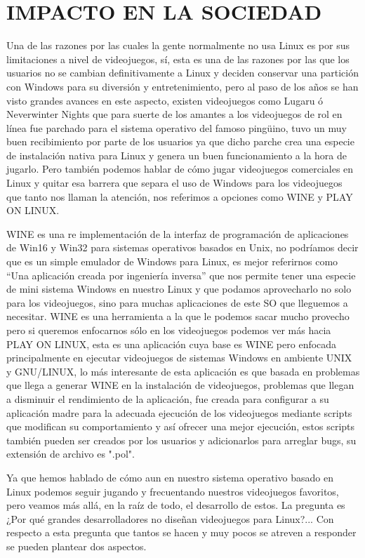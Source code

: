 \section*{IMPACTO EN LA SOCIEDAD}

Una de las razones por las cuales la gente normalmente no usa
Linux es por sus limitaciones a nivel de videojuegos, sí, esta es
una de las razones por las que los usuarios no se cambian
definitivamente a Linux y deciden conservar una partición con
Windows para su diversión y entretenimiento, pero al paso de
los años se han visto grandes avances en este aspecto, existen
videojuegos como Lugaru ó Neverwinter Nights que para suerte
de los amantes a los videojuegos de rol en línea fue parchado
para el sistema operativo del famoso pingüino, tuvo un muy
buen recibimiento por parte de los usuarios ya que dicho parche
crea una especie de instalación nativa para Linux y genera un
buen funcionamiento a la hora de jugarlo. Pero también
podemos hablar de cómo jugar videojuegos comerciales en
Linux y quitar esa barrera que separa el uso de Windows para
los videojuegos que tanto nos llaman la atención, nos referimos
a opciones como WINE y PLAY ON LINUX.

WINE es una re implementación de la interfaz de programación
de aplicaciones de Win16 y Win32 para sistemas operativos
basados en Unix, no podríamos decir que es un simple emulador
de Windows para Linux, es mejor referirnos como “Una
aplicación creada por ingeniería inversa” que nos permite tener
una especie de mini sistema Windows en nuestro Linux y que
podamos aprovecharlo no solo para los videojuegos, sino para
muchas aplicaciones de este SO que lleguemos a necesitar.
WINE es una herramienta a la que le podemos sacar mucho
provecho pero si queremos enfocarnos sólo en los videojuegos
podemos ver más hacia PLAY ON LINUX, esta es una aplicación
cuya base es WINE pero enfocada principalmente en ejecutar
videojuegos de sistemas Windows en ambiente UNIX y
GNU/LINUX, lo más interesante de esta aplicación es que
basada en problemas que llega a generar WINE en la instalación
de videojuegos, problemas que llegan a disminuir el rendimiento
de la aplicación, fue creada para configurar a su aplicación
madre para la adecuada ejecución de los videojuegos mediante
scripts que modifican su comportamiento y así ofrecer una mejor
ejecución, estos scripts también pueden ser creados por los
usuarios y adicionarlos para arreglar bugs, su extensión de
archivo es ".pol".

Ya que hemos hablado de cómo aun en nuestro sistema
operativo basado en Linux podemos seguir jugando y
frecuentando nuestros videojuegos favoritos, pero veamos más
allá, en la raíz de todo, el desarrollo de estos. La pregunta es
¿Por qué grandes desarrolladores no diseñan videojuegos para
Linux?... Con respecto a esta pregunta que tantos se hacen y
muy pocos se atreven a responder se pueden plantear dos
aspectos.

